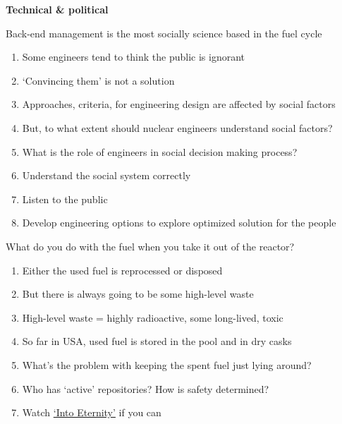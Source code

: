 \documentclass[aspectratio=1610,pdftex,dvipsnames,compress,xcolor={dvipsnames}]{beamer}
\begin{document}
\begin{frame}[plain]{}
    \centering\LARGE\textbf{Technical \& political}
\end{frame}


\addtocounter{framenumber}{-1} 
\begin{frame}{Back-end management is the most socially science based in the fuel cycle}
    \begin{enumerate}[series=outerlist,topsep=0pt,itemsep=15pt,leftmargin=*,label=(\arabic*)]
        \item[]Some engineers tend to think the public is ignorant
        \item[]`Convincing them' is not a solution
        \item[]Approaches, criteria, for engineering design are affected by social factors
        \item[]But, to what extent should nuclear engineers understand social factors?
        \item[]What is the role of engineers in social decision making process?
        \item[]Understand the social system correctly
        \item[]Listen to the public
        \item[]Develop engineering options to explore optimized solution for the people
    \end{enumerate}
\end{frame}


\begin{frame}{What do you do with the fuel when you take it out of the reactor?}
    \begin{enumerate}[topsep=0pt,itemsep=21pt,leftmargin=*,label=(\arabic*)]
        \item[]Either the used fuel is reprocessed or disposed
        \item[]But there is always going to be some high-level waste
        \item[]High-level waste = highly radioactive, some long-lived, toxic
        \item[]So far in USA, used fuel is stored in the pool and in dry casks
        \item[]What's the problem with keeping the spent fuel just lying around?
        \item[]Who has `active' repositories? How is safety determined?
        \item[]Watch \href{https://uidaho.pressbooks.pub/nuclearengineering/chapter/back-end-of-the-fuel-cycle-2/}{`Into Eternity'} if you can
    \end{enumerate}
\end{frame}
\end{document}
